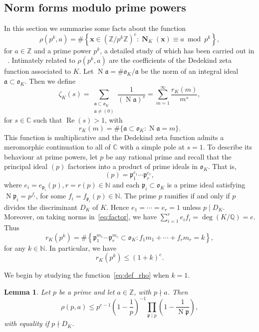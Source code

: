 \documentclass[11pt,letterpaper]{amsart}
\renewcommand{\leq}{\leqslant}
\newtheorem{lemma}[theorem]{Lemma}
\theoremstyle{definition}
\numberwithin{equation}{section}
\newcommand\ZZ{\mathbb{Z}}
\newcommand\NN{\mathbb{N}}
\newcommand\CC{\mathbb{C}}
\newcommand{\x}{\mathbf{x}}
\DeclareMathOperator{\n}{N}
\DeclareMathOperator{\real}{Re}
\DeclareMathOperator{\nf}{\mathbf{N}}
\newcommand{\fo}{\mathfrak{o}}
\newcommand{\fa}{\mathfrak{a}}
\newcommand{\fp}{\mathfrak{p}}
\newcommand{\0}{\mathbf{0}}
\begin{document}
\subsection{Norm forms modulo prime powers}\label{sec:local}

In this section we summarise some facts about the function
\begin{equation}\label{eq:def_rho}
\rho(p^k,a)=\#\left\{\x\in (\ZZ/p^k\ZZ)^e : \nf_K(\x)\equiv a\bmod{p^k}\right\},
\end{equation}
for $a\in \ZZ$ and  a prime power $p^k$, 
a detailed study of which has been  carried out in ~\cite[\S 4]{nf}.
Intimately related to $\rho(p^k,a)$ are the coefficients of the  Dedekind zeta function associated to $K$.
Let  $\n\fa=\#\fo_K/\fa$ be the  norm of an integral ideal $\fa\subset\fo_K$.
Then we  define
$$
\zeta_K(s)=\sum_{\substack{\fa\subset \fo_K\\\fa\neq (0)}} \frac{1}{(\n \fa)^s} =
\sum_{m=1}^\infty \frac{r_K(m)}{m^{s}},
$$
for $s\in \CC$ such that $\real(s)>1$, with 
$$
r_K(m)=\#\{\fa \subset \fo_K: \n \fa=m\}.
$$
This function  is multiplicative and 
the Dedekind zeta function admits a meromorphic continuation to all of $\CC$ with a simple 
pole at $s=1$. 
To describe its behaviour at prime powers, let $p$ be any rational prime
and recall that the principal ideal $(p)$ factorises into a product of
prime ideals in $\fo_K$. That is,
\begin{equation}\label{eq:factor}
 (p)=\fp_1^{e_1}\cdots \fp_{r}^{e_r},
 \end{equation}
where $e_i=e_{\fp_i}(p), r=r(p)\in \NN$ and 
each $\fp_i \subset \fo_K$ is a prime ideal satisfying $\n\fp_i=p^{f_i}$,
for some $f_i=f_{\fp_i}(p) \in \NN$. 
The prime $p$ ramifies if and only if $p$ divides the discriminant $D_K$ of $K$. 
Hence $e_1=\cdots=e_r=1$ unless $p\mid D_K$.
Moreover, on taking norms in~\eqref{eq:factor}, we have
$\sum_{i=1}^re_if_i=\deg(K/\mathbb{Q})=e.$
Thus
$$
r_K(p^k)=\#\left\{\fp_1^{m_1}\cdots \fp_r^{m_r}\subset \fo_K:
f_1m_1+\cdots+f_r m_r=k\right\},
$$
for any $k\in \NN$. In particular, we have
\begin{equation}\label{eq:moon}
r_K(p^k)\leq (1+k)^e.
\end{equation}

We begin by studying the function~\eqref{eq:def_rho} when $k=1$.

\begin{lemma}\label{lem:io}
Let $p$ be a prime and let  $a\in \ZZ$, with  $p\nmid a$. 
Then 
$$
\rho(p,a)\leq 
p^{e-1}\left(1-\frac{1}{p}\right)^{-1}\prod_{\fp\mid p} \left(1-\frac{1}{\n \fp}\right),
$$
with equality if $p\nmid D_K$.
\end{lemma}
\end{document}
